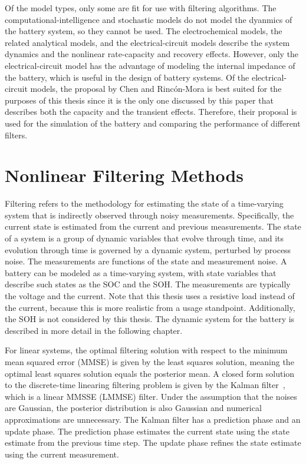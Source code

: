 \documentclass[../zhang_thesis.tex]{subfiles}
\begin{document}
Of the model types, only some are fit for use with filtering algorithms. The computational-intelligence and stochastic models do not model the dyanmics of the battery system, so they cannot be used. The electrochemical models, the related analytical models, and the electrical-circuit models describe the system dynamics and the nonlinear rate-capacity and recovery effects. However, only the electrical-circuit model has the advantage of modeling the internal impedance of the battery,
which is useful in the design of battery systems. Of the electrical-circuit models, the proposal by Chen and Rinc\'on-Mora is best suited for the purposes of this thesis since it is the only one discussed by this paper that describes both the capacity and the transient effects. Therefore, their proposal is used for the simulation of the battery and comparing the performance of different filters.


\section{Nonlinear Filtering Methods}

Filtering refers to the methodology for estimating the state of a time-varying system that is indirectly observed through noisy measurements. Specifically, the current state is estimated from the current and previous measurements. The state of a system is a group of dynamic variables that evolve through time, and its evolution through time is governed by a dynamic system, perturbed by process noise. The measurements are functions of the state and measurement noise. A battery can be modeled as a
time-varying system, with state variables that describe such states as the SOC and the SOH. The measurements are typically the voltage and the current. Note that this thesis uses a resistive load instead of the current, because this is more realistic from a usage standpoint. Additionally, the SOH is not considered by this thesis. The dynamic system for the battery is described in more detail in the following chapter.

For linear systems, the optimal filtering solution with respect to the minimum mean squared error (MMSE) is given by the least squares solution, meaning the optimal least squares solution equals the posterior mean. A closed form solution to the discrete-time linearing filtering problem is given by the Kalman filter~\cite{kalman60}, which is a linear MMSSE (LMMSE) filter. Under the assumption that the noises are Gaussian, the posterior distribution is also Gaussian and numerical
approximations are unnecessary. The Kalman filter has a prediction phase and an update phase. The prediction phase estimates the current state using the state estimate from the previous time step. The update phase refines the state estimate using the current measurement.
\end{document}

